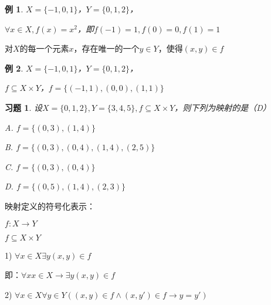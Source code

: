 \documentclass{article}
\newtheorem*{Exercise}{习题}
\newtheorem*{Example}{例}
\begin{document}
\begin{CJK*}{UTF8}{gbsn}
    \begin{Example}
      $X=\{-1,0,1\}$，$Y=\{0,1,2\}$，

      $\forall x \in X, f(x)=x^2$，即$f(-1)=1,f(0)=0,f(1)=1$
  \end{Example}


对$X$的每一个元素$x$，存在唯一的一个$y\in Y$，使得$(x,y) \in f$

  \begin{Example}
    $X=\{-1,0,1\}$，$Y=\{0,1,2\}$，

$f\subseteq X \times Y$，$f=\{(-1,1),(0,0),(1,1)\}$
  \end{Example}

  \begin{Exercise}
    设$X=\{0,1,2\}, Y= \{3,4,5\}, f\subseteq X \times Y$，则下列为映射的是（D）

    A. $f = \{(0,3), (1,4)\}$

    B. $f = \{(0,3), (0,4), (1,4),(2,5)\}$

    C. $f = \{(0,3), (0,4)\}$

    D. $f = \{(0,5), (1,4), (2,3)\}$
  \end{Exercise}

  映射定义的符号化表示：

  $f:X\to Y$
  
  $f\subseteq X\times Y$

  1) $\forall x \in X \exists y (x,y) \in f$

  即：$\forall x x \in X \to \exists y (x,y) \in f$

  2) $\forall x \in X \forall y \in Y ((x,y) \in f \land (x, y') \in f \to y = y')$


\end{CJK*}
\end{document}
